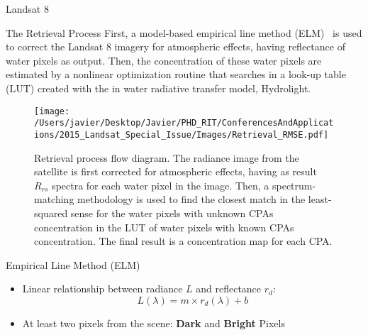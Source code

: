 \documentclass{beamer}
\begin{document}
\begin{frame}{}
\begin{columns}[t]
\begin{column}{.3\linewidth}
\begin{block}{Landsat 8}
\vspace{-.5cm}
\end{block}
\begin{block}{The Retrieval Process}
\justifying\small First, a model-based empirical line method (ELM)~\cite{Concha2014SPIE} is used to correct the Landsat 8 imagery for atmospheric effects, having reflectance of water pixels as output. Then, the concentration of these water pixels are estimated by a nonlinear optimization routine that searches in a look-up table (LUT) created with the in water radiative transfer model, Hydrolight.
\vspace{1cm}   
\begin{center}
\begin{figure}[htbp!]
  \centering
    \texttt{[image: /Users/javier/Desktop/Javier/PHD\_RIT/ConferencesAndApplications/2015\_Landsat\_Special\_Issue/Images/Retrieval\_RMSE.pdf]}
    \caption{Retrieval process flow diagram. The radiance image from the satellite is first corrected for atmospheric effects, having as result $R_{rs}$ spectra for each water pixel in the image. Then, a spectrum-matching methodology is used to find the closest match in the least-squared sense for the water pixels with unknown CPAs concentration in the LUT of water pixels with known CPAs concentration. The final result is a concentration map for each CPA.  \label{fig:retrieval} }
\end{figure}
\end{center}
\end{block}

\begin{block}{Empirical Line Method (ELM)}
\begin{itemize}
  \item \small Linear relationship between radiance $L$ and reflectance $r_d$:
\begin{equation}\label{eq:ELM}
  L(\lambda)=m\times r_d(\lambda)+b
\end{equation}

\vspace{0.005cm}
\item \small At least two pixels from the scene: {\bf \small Dark} and {\bf \small Bright} Pixels

\end{itemize}

\begin{figure}[htb]
  \centering
{}
\end{figure}
\end{block}
\end{column}
\end{columns}
\end{frame}
\end{document}
